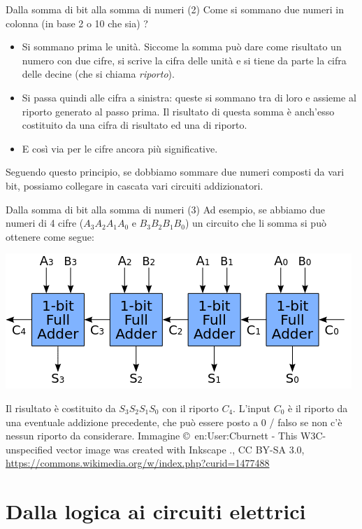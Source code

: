 \documentclass[aspectratio=169,10pt,dvipsnames,xcolor=table,handout]{beamer}
\begin{document}
\begin{frame}{Dalla somma di bit alla somma di numeri (2)}
    Come si sommano due numeri in colonna (in base 2 o 10 che sia) ?
    \begin{itemize}
        \item Si sommano prima le unità. Siccome la somma può dare come risultato un numero con due cifre, si scrive la cifra delle unità e si tiene da parte la cifra delle decine (che si chiama \emph{riporto}).
        \item Si passa quindi alle cifra a sinistra: queste si sommano tra di loro e assieme al riporto generato al passo prima. Il risultato di questa somma è anch'esso costituito da una cifra di risultato ed una di riporto.
        \item E così via per le cifre ancora più significative.
    \end{itemize}
    Seguendo questo principio, se dobbiamo sommare due numeri composti da vari bit, possiamo collegare in cascata vari circuiti addizionatori.
\end{frame}

\begin{frame}{Dalla somma di bit alla somma di numeri (3)}
    Ad esempio, se abbiamo due numeri di 4 cifre ($A_3 A_2 A_1 A_0$ e $B_3 B_2 B_1 B_0$) un circuito che li somma si può ottenere come segue:
    \begin{center}
        \includegraphics[height=0.3\textheight]{4-bit_adder.png}
    \end{center}
    Il risultato è costituito da $S_3 S_2 S_1 S_0$ con il riporto $C_4$. L'input $C_0$ è il riporto da una eventuale addizione precedente, che può essere posto a 0 / falso se non c'è nessun riporto da considerare.
    \vfill
    {\scriptsize Immagine \copyright\ en:User:Cburnett - This W3C-unspecified vector image was created with Inkscape ., CC BY-SA 3.0, \url{https://commons.wikimedia.org/w/index.php?curid=1477488}}
\end{frame}


\section{Dalla logica ai circuiti elettrici}
\end{document}
